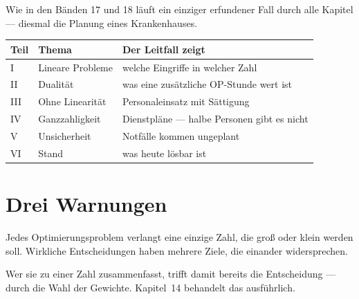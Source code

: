 \begin{merksatz}
Wie in den Bänden 17 und 18 läuft ein einziger erfundener Fall durch alle Kapitel --- diesmal die Planung eines Krankenhauses.

\begin{center}
{\small
\renewcommand{\arraystretch}{1.5}
\begin{tabular}{@{}P{1.6cm}P{2.8cm}P{3.6cm}@{}}
\toprule
\textbf{Teil} & \textbf{Thema} & \textbf{Der Leitfall zeigt}\\
\midrule
I & Lineare Probleme & welche Eingriffe in welcher Zahl\\
II & Dualität & was eine zusätzliche OP-Stunde wert ist\\
III & Ohne Linearität & Personaleinsatz mit Sättigung\\
IV & Ganzzahligkeit & Dienstpläne --- halbe Personen gibt es nicht\\
V & Unsicherheit & Notfälle kommen ungeplant\\
VI & Stand & was heute lösbar ist\\
\bottomrule
\end{tabular}}
\end{center}

\begin{center}
\begin{minipage}{0.88\textwidth}
\end{minipage}
\end{center}
\end{merksatz}

\section*{Drei Warnungen}

\begin{warnung}
Jedes Optimierungsproblem verlangt eine einzige Zahl, die groß oder klein werden soll. Wirkliche Entscheidungen haben mehrere Ziele, die einander widersprechen.

\begin{center}
\begin{minipage}{0.9\textwidth}
Wer sie zu einer Zahl zusammenfasst, trifft damit bereits die Entscheidung --- durch die Wahl der Gewichte. Kapitel~14 behandelt das ausführlich.
\end{minipage}
\end{center}
\end{warnung}

